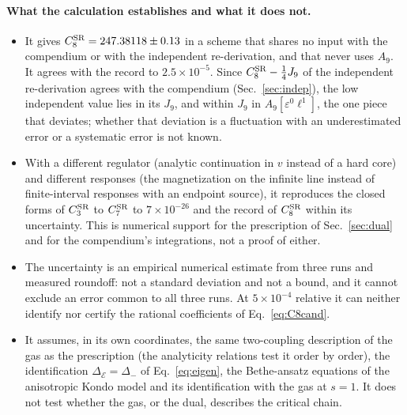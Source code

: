 \documentclass[11pt,a4paper]{article}
\numberwithin{equation}{section}
\newcommand{\De}{\Delta_{\mathcal E}}
\newcommand{\CSR}{C^{\rm SR}}
\newcommand{\sci}[2]{#1\times10^{#2}}
\begin{document}
\paragraph{What the calculation establishes and what it does not.}
\begin{itemize}
\item It gives $\CSR_8=247.38118\pm0.13$ in a scheme that shares no input with the compendium or with the independent
 re-derivation, and that never uses $A_9$. It agrees with the record to $\sci{2.5}{-5}$. Since $\CSR_8-\frac14J_9$ of
 the independent re-derivation agrees with the compendium (Sec.~\ref{sec:indep}), the low independent value lies in its
 $J_9$, and within $J_9$ in $A_9[\varepsilon^0\ell^1]$, the one piece that deviates; whether that deviation is a
 fluctuation with an underestimated error or a systematic error is not known.
\item With a different regulator (analytic continuation in $v$ instead of a hard core) and different responses (the
 magnetization on the infinite line instead of finite-interval responses with an endpoint source), it reproduces the
 closed forms of $\CSR_3$ to $\CSR_7$ to $\sci{7}{-26}$ and the record of $\CSR_8$ within its uncertainty. This is
 numerical support for the prescription of Sec.~\ref{sec:dual} and for the compendium's integrations, not a proof of
 either.
\item The uncertainty is an empirical numerical estimate from three runs and measured roundoff: not a standard
 deviation and not a bound, and it cannot exclude an error common to all three runs. At $\sci{5}{-4}$ relative it can
 neither identify nor certify the rational coefficients of Eq.~\eqref{eq:C8cand}.
\item It assumes, in its own coordinates, the same two-coupling description of the gas as the prescription (the
 analyticity relations test it order by order), the identification $\De=\Delta_-$ of Eq.~\eqref{eq:eigen}, the
 Bethe-ansatz equations of the anisotropic Kondo model and its identification with the gas at $s=1$. It does not test
 whether the gas, or the dual, describes the critical chain.
\end{itemize}

\end{document}
